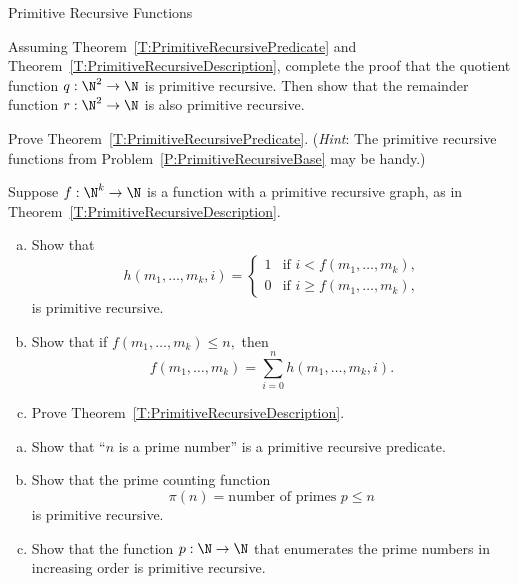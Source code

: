 \begin{unit}{Primitive Recursive Functions}
\begin{problem}
  Assuming Theorem~\ref{T:PrimitiveRecursivePredicate} and Theorem~\ref{T:PrimitiveRecursiveDescription}, complete the proof that the quotient function \(q:\N^2\to\N\) is primitive recursive.
  Then show that the remainder function \(r:\N^2\to\N\) is also primitive recursive.
\end{problem}

\begin{problem}
  Prove Theorem~\ref{T:PrimitiveRecursivePredicate}.
  (\textit{Hint}: The primitive recursive functions from Problem~\ref{P:PrimitiveRecursiveBase} may be handy.)
\end{problem}

\begin{problem}
  Suppose \(f:\N^k\to\N\) is a function with a primitive recursive graph, as in Theorem~\ref{T:PrimitiveRecursiveDescription}.
  \begin{enumerate}[(a)]
  \item Show that \[h(m_1,\dots,m_k,i) = \begin{cases} 
      1 & \text{if $i < f(m_1,\dots,m_k)$,} \\
      0 & \text{if $i \geq f(m_1,\dots,m_k)$,}
    \end{cases}\] is primitive recursive.
  \item Show that if \(f(m_1,\dots,m_k) \leq n,\) then \[f(m_1,\dots,m_k) = \sum_{i=0}^n h(m_1,\dots,m_k,i).\]
  \item Prove Theorem~\ref{T:PrimitiveRecursiveDescription}.
  \end{enumerate}
\end{problem}

\begin{problem}\mbox{}
  \begin{enumerate}[(a)]
  \item Show that ``\(n\) is a prime number'' is a primitive recursive predicate.
  \item Show that the prime counting function \[\pi(n) = \text{number of primes $p \leq n$}\] is primitive recursive.
  \item Show that the function \(p:\N\to\N\) that enumerates the prime numbers in increasing order is primitive recursive.
  \end{enumerate}
\end{problem}

\end{unit}
